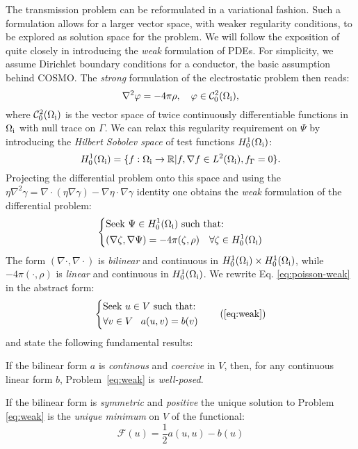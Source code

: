 The transmission problem can be reformulated in a variational fashion.
Such a formulation allows for a larger vector space, with weaker regularity
conditions, to be explored as solution space for the problem.
We will follow the exposition of \citeauthor{Ern2004-oo} quite closely
in introducing the \emph{weak} formulation of \glspl{PDE}.
For simplicity, we assume Dirichlet boundary conditions for a conductor,
\ie the basic assumption behind \acrshort{COSMO}.
The \emph{strong} formulation of the electrostatic problem then reads:
\begin{equation}\label{eq:poisson-cosmo}
  \nabla^2\varphi = -4\pi\rho,
  \quad \varphi \in \mathcal{C}^2_0(\Omega_\mathrm{i}),
\end{equation}
where $\mathcal{C}^2_0(\Omega_\mathrm{i})$ is the vector space of twice
continuously differentiable functions in $\Omega_\mathrm{i}$ with null trace on
$\Gamma$.
We can relax this regularity requirement on $\Psi$ by introducing the
\emph{Hilbert Sobolev space} of test functions $H_0^1(\Omega_\mathrm{i})$:
\begin{equation}
  H_0^1(\Omega_\mathrm{i}) = \lbrace
  f : \Omega_\mathrm{i} \rightarrow \mathbb{R}
  | f, \nabla f \in L^2(\Omega_\mathrm{i}), f_\Gamma = 0
  \rbrace.
\end{equation}
Projecting the differential problem onto this space and using the
$\eta\nabla^2\gamma = \nabla\cdot(\eta\nabla\gamma) - \nabla\eta\cdot\nabla\gamma$ identity
one obtains the \emph{weak} formulation of the differential problem:
\begin{equation}\label{eq:poisson-weak}
  \left\{
  \begin{aligned}
    &\text{Seek $\Psi \in H_0^1(\Omega_\mathrm{i})$ such that:}\\
    &(\nabla\zeta, \nabla\Psi) =
    -4\pi(\zeta, \rho) \quad
    \forall \zeta\in H_0^1(\Omega_\mathrm{i})
  \end{aligned}
  \right.
\end{equation}
The form $(\nabla\cdot, \nabla\cdot)$ is \emph{bilinear} and continuous
in $H_0^1(\Omega_\mathrm{i})\times H_0^1(\Omega_\mathrm{i})$, while $-4\pi(\cdot, \rho)$ is
\emph{linear} and continuous in $H_0^1(\Omega_\mathrm{i})$.
We rewrite Eq. \eqref{eq:poisson-weak} in the abstract form:
\begin{equation}
  \left\{
  \begin{aligned}
    &\text{Seek $u \in V$ such that:}\\
    &\forall v \in V \,\,\,\,\,
    a(u, v) = b(v)
  \end{aligned}
  \right.
  \tag{\ref{eq:weak}}
\end{equation}
and state the following fundamental results:
\begin{lemma}
  If the bilinear form $a$ is \emph{continous} and \emph{coercive}
  in $V$, then, for any continuous linear form $b$, Problem~\eqref{eq:weak} is
  \emph{well-posed}.
\end{lemma}
\begin{corollary}
  If the bilinear form is \emph{symmetric} and \emph{positive}
  the unique solution to Problem \eqref{eq:weak} is
  the \emph{unique minimum} on $V$ of the functional:
  \[
  \mathcal{F}(u) = \frac{1}{2}a(u, u) - b(u)
  \]
\end{corollary}

